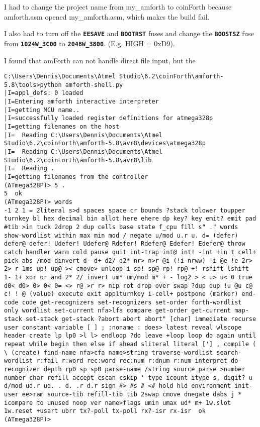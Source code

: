 \documentclass[10pt,english]{article}
\begin{document}
I had to change the project name from my\_amforth to coinForth because
amforth.asm opened my\_amforth.asm, which makes the build fail.

I also had to turn off the \texttt{\textbf{EESAVE}} and \texttt{\textbf{BOOTRST}}
fuses and change the \texttt{\textbf{BOOSTSZ}} fuse from \texttt{\textbf{1024W\_3C00}}
to \texttt{\textbf{2048W\_3800}}. (E.g. HIGH = 0xD9).

I found that amForth can not handle direct file input, but the 

\begin{lstlisting}
C:\Users\Dennis\Documents\Atmel Studio\6.2\coinForth\amforth-5.8\tools>python amforth-shell.py
|I=appl_defs: 0 loaded 
|I=Entering amforth interactive interpreter 
|I=getting MCU name.. 
|I=successfully loaded register definitions for atmega328p 
|I=getting filenames on the host 
|I=  Reading C:\Users\Dennis\Documents\Atmel Studio\6.2\coinForth\amforth-5.8\avr8\devices\atmega328p
|I=  Reading C:\Users\Dennis\Documents\Atmel Studio\6.2\coinForth\amforth-5.8\avr8\lib 
|I=  Reading . 
|I=getting filenames from the controller 
(ATmega328P)> 5 .
5  ok 
(ATmega328P)> words 
-1 2 1 = 2literal s>d spaces space cr bounds ?stack tolower toupper turnkey bl hex decimal bin allot here ehere dp key? key emit? emit pad #tib >in tuck 2drop 2 dup cells base state f_cpu fill s" ." words show-wordlist within max min mod / negate u/mod u.r u. d= (defer) defer@ defer! Udefer! Udefer@ Rdefer! Rdefer@ Edefer! Edefer@ throw catch handler warm cold pause quit int-trap int@ int! -int +in t cell+ pick abs /mod dinvert d- d+ d2/ d2* nr> n>r @i (!i-nrww) !i @e !e 2r> 2> r 1ms up! up@ >< cmove> unloop i sp! sp@ rp! rp@ +! rshift lshift 1- 1+ xor or and 2* 2/ invert um* um/mod m* + - log2 > < u> u< 0 true d0< d0> 0> 0< 0= <> r@ >r r> nip rot drop over swap ?dup dup !u @u c@ c! ! @ (value) execute exit applturnkey i-cell+ postpone (marker) end-code code get-recognizers set-recognizers set-order forth-wordlist only wordlist set-current nfa>lfa compare get-order get-current map-stack set-stack get-stack ?abort abort abort" [char] immediate recurse user constant variable [ ] ; :noname : does> latest reveal wlscope header create lp lp0 >l l> endloop ?do leave +loop loop do again until repeat while begin then else if ahead sliteral literal ['] , compile ( \ (create) find-name nfa>cfa name>string traverse-wordlist search-wordlist r:fail r:word rec:word rec:num r:dnum r:num interpret do-recognizer depth rp0 sp sp0 parse-name /string source parse >number number char refill accept cscan cskip ' type icount itype s, digit? u d/mod ud.r ud. . d. .r d.r sign #> #s # <# hold hld environment init-user ee>ram source-tib refill-tib tib 2swap cmove dnegate dabs j * icompare to unused noop ver name>flags umin umax ud* m+ 1w.slot 1w.reset +usart ubrr tx?-poll tx-poll rx?-isr rx-isr  ok 
(ATmega328P)>
\end{lstlisting}
\end{document}
